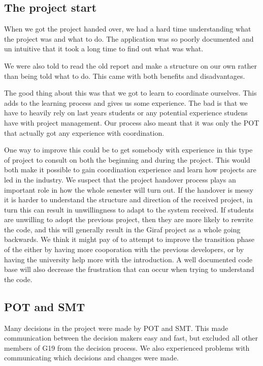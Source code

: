 \subsection{The project start}
When we got the project handed over, we had a hard time understanding what the project was and what to do. The application was so poorly documented and un intuitive that it took a long time to find out what was what.

We were also told to read the old report and make a structure on our own rather than being told what to do. This came with both benefits and disadvantages.

The good thing about this was that we got to learn to coordinate ourselves. This adds to the learning process and gives us some experience. The bad is that we have to heavily rely on last years students or any potential experience studens have with project management. Our process also meant that it was only the \gls{POT} that actually got any experience with coordination. 

One way to improve this could be to get somebody with experience in this type of project to consult on both the beginning and during the project. This would both make it possible to gain coordination experience and learn how projects are led in the industry. We suspect that the project handover process plays an important role in how the whole senester will turn out. If the handover is messy it is harder to understand the structure and direction of the received project, in turn this can result in unwillingness to adapt to the system received. If students are unwilling to adopt the previous project, then they are more likely to rewrite the code, and this will generally result in the Giraf project as a whole going backwards. We think it might pay of to attempt to improve the transition phase of the either by having more cooporation with the previous developers, or by having the university help more with the introduction. A well documented code base will also decrease the frustration that can occur when trying to understand the code.

\subsection{\gls{POT} and \gls{SMT}}
Many decisions in the project were made by \gls{POT} and \gls{SMT}. This made communication between the decision makers easy and fast, but excluded all other members of \gls{G19} from the decision process. We also experienced problems with communicating which decisions and changes were made.

